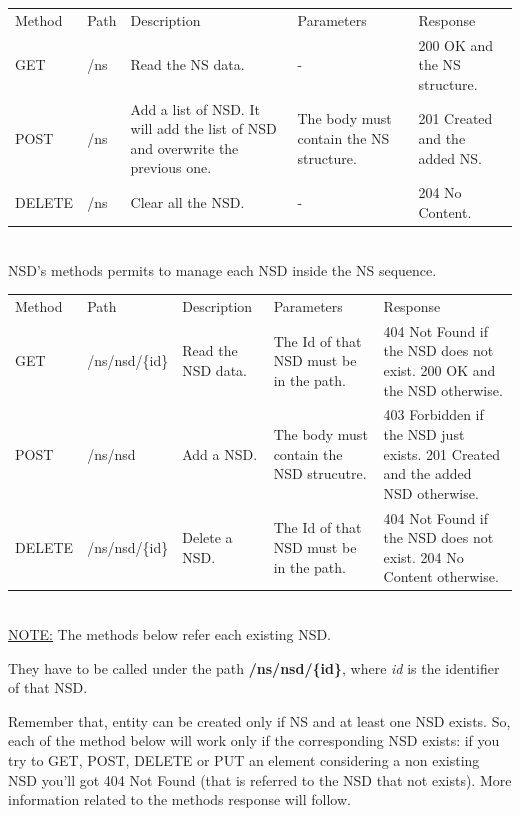 \documentclass[11pt, english]{article}
\begin{document}
\begin{tabular}{ |p{2cm}|m{3cm}|p{3cm}|p{3cm}|p{4cm}| }
    \hline
    \rowcolor{black} \multicolumn{5}{|c|}{\textcolor{white}{NS}} \\
    \hline
    \rowcolor{Gray}
    Method & Path & Description & Parameters & Response \\
    \hline
    GET   & /ns & Read the NS data. & - & 200 OK and the NS structure. \\
    \hline
    POST & /ns & Add a list of NSD. It will add the list of NSD and overwrite the previous one. & The body must contain the NS structure. & 201 Created and the added NS. \\
    \hline
    DELETE & /ns & Clear all the NSD.  & - & 204 No Content. \\
    \hline
\end{tabular} \\

NSD's methods permits to manage each NSD inside the NS sequence. \\

\begin{tabular}{ |p{2cm}|m{3cm}|p{3cm}|p{3cm}|p{4cm}| }
    \hline
    \rowcolor{black} \multicolumn{5}{|c|}{\textcolor{white}{NSD}} \\
    \hline
    \rowcolor{Gray}
    Method & Path & Description & Parameters & Response \\
    \hline
    GET   & /ns/nsd/\{id\} & Read the NSD data. & The Id of that NSD must be in the path. & 404 Not Found  if the NSD does not exist. 200 OK and the NSD otherwise. \\
    \hline
    POST & /ns/nsd & Add a NSD. & The body must contain the NSD strucutre. & 403 Forbidden if the NSD just exists. 201 Created and the added NSD otherwise. \\
    \hline
    DELETE & /ns/nsd/\{id\} & Delete a NSD. & The Id of that NSD must be in the path. & 404 Not Found  if the NSD does not exist. 204 No Content otherwise. \\
    \hline
\end{tabular} \\

\underline{NOTE:} The methods below refer each existing NSD. 

They have to be called under the path \textbf{/ns/nsd/\{id\}}, where \textit{id} is the identifier of that NSD. 

Remember that, entity can be created only if NS and at least one NSD exists. So, each of the method below will work only if the corresponding NSD exists: if you try to GET, POST, DELETE or PUT an element considering a non existing NSD you'll got 404 Not Found (that is referred to the NSD that not exists). More information related to the methods response will follow.
\end{document}
